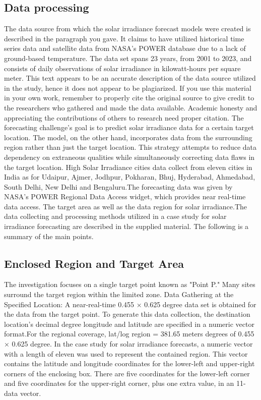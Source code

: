 \documentclass[a4paper,fleqn]{cas-sc}
\begin{document}
\subsection{Data processing}
The data source from which the solar irradiance forecast models were created is described in the paragraph you
gave. It claims to have utilized historical time series data and satellite data from NASA’s POWER database due to a lack of ground-based temperature. The data set spans 23 years, from 2001 to 2023, and consists of daily observations of solar irradiance in kilowatt-hours per square meter. This text appears to be an accurate description of the data source utilized in the study, hence it does not appear to be plagiarized. If you use this material in your own work, remember to properly cite the original source to give credit to the researchers who gathered and made the data available. Academic honesty and appreciating the contributions of others to research need proper citation. The forecasting challenge’s goal is to predict solar irradiance data for a certain target location. The model, on the other hand, incorporates data from the surrounding region rather than just the target location. This strategy attempts to reduce data dependency on extraneous qualities while simultaneously correcting data flaws in the target location. High Solar Irradiance cities data collect from eleven cities in India as for Udaipur, Ajmer, Jodhpur, Pokharan, Bhuj, Hyderabad, Ahmedabad, South Delhi, New Delhi and Bengaluru.The forecasting data was given by NASA’s POWER Regional Data Access widget, which provides near real-time data access. The target area as well as the data region for solar irradiance.The data collecting and processing methods utilized in a case study for solar irradiance forecasting are described in the supplied material. The following is a summary of the main points.\cite{brahma2020solar}

\subsection{ Enclosed Region and Target Area}
The investigation focuses on a single target point known as "Point P." Many sites surround the target region within the limited zone. Data Gathering at the Specified Location: A near-real-time 0.455 × 0.625 degree data set is obtained for the data from the target point. To generate this data collection, the destination location’s decimal degree longitude and latitude are specified in a numeric vector format.For the regional coverage, lat/log region = 381.65 meters degrees of 0.455 × 0.625 degree. In the case study for solar irradiance forecasts, a numeric vector with a length of eleven was used to represent the contained region. This vector contains the latitude and longitude coordinates for the lower-left and upper-right corners of the enclosing box. There are five coordinates for the lower-left corner and five coordinates for the upper-right corner, plus one extra value, in an 11-data vector.\cite{belmahdi2020one}
\end{document}
